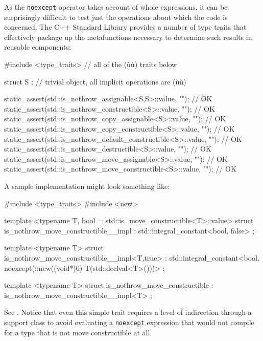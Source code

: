 As the \lstinline!noexcept! operator takes account of whole expressions, it
can be surprisingly difficult to test just the operations about which
the code is concerned. The C++ Standard Library provides a number of
type traits that effectively package up the metafunctions necessary to
determine such results in reusable components:

\begin{emcppslisting}
#include <type_traits>  // all of the (ù{}ù) traits below

struct S { };  // trivial object, all implicit operations are (ù{}ù)

static_assert(std::is_nothrow_assignable<S,S>::value, "");           // OK
static_assert(std::is_nothrow_constructible<S>::value, "");          // OK
static_assert(std::is_nothrow_copy_assignable<S>::value, "");        // OK
static_assert(std::is_nothrow_copy_constructible<S>::value, "");     // OK
static_assert(std::is_nothrow_default_constructible<S>::value, "");  // OK
static_assert(std::is_nothrow_destructible<S>::value, "");           // OK
static_assert(std::is_nothrow_move_assignable<S>::value, "");        // OK
static_assert(std::is_nothrow_move_constructible<S>::value, "");     // OK
\end{emcppslisting}
    

\noindent A sample implementation might look something like:

\begin{emcppshiddenlisting}[emcppsbatch=e28]
#include <type_traits>
#include <new>
\end{emcppshiddenlisting}
\begin{emcppslisting}[emcppsbatch=e28]
template <typename T, bool = std::is_move_constructible<T>::value>
struct is_nothrow_move_constructible__impl
    : std::integral_constant<bool, false> { };

template <typename T>
struct is_nothrow_move_constructible__impl<T,true>
    : std::integral_constant<bool,
          noexcept(::new((void*)0) T(std::declval<T>()))> { };

template <typename T>
struct is_nothrow_move_constructible
    : is_nothrow_move_constructible__impl<T> { };
\end{emcppslisting}
    

\noindent See . Notice that even this
simple trait requires a level of indirection through a support class to
avoid evaluating a \lstinline!noexcept! expression that would not compile
for a type that is not move constructible at all.

